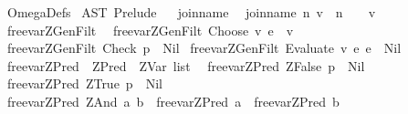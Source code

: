 %
\begin{isabellebody}%
%
%
\isadelimtheory
%
\endisadelimtheory
%
\isatagtheory
{}\isamarkupfalse%
\ OmegaDefs\isanewline
{}\ AST\ Prelude\isanewline
{}%
\endisatagtheory
{\isafoldtheory}%
%
\isadelimtheory
\isanewline
%
\endisadelimtheory
\ \isanewline
{}\isamarkupfalse%
\ join{\isacharunderscore}name\isanewline
{}\isanewline
\ \ {\isachardoublequoteopen}join{\isacharunderscore}name\ n\ v\ {\isacharequal}\ {\isacharparenleft}n\ {\isacharat}\ {\isacharparenleft}{\isacharprime}{\isacharprime}{\isacharunderscore}{\isacharprime}{\isacharprime}\ {\isacharat}\ v{\isacharparenright}{\isacharparenright}{\isachardoublequoteclose}\isanewline
\isanewline
\ \isanewline
{}\isamarkupfalse%
\ free{\isacharunderscore}var{\isacharunderscore}ZGenFilt\isanewline
{}\isanewline
\ \ {\isachardoublequoteopen}free{\isacharunderscore}var{\isacharunderscore}ZGenFilt\ {\isacharparenleft}Choose\ v\ e{\isacharparenright}\ {\isacharequal}\ {\isacharbrackleft}v{\isacharbrackright}{\isachardoublequoteclose}\isanewline
{\isacharbar}\ {\isachardoublequoteopen}free{\isacharunderscore}var{\isacharunderscore}ZGenFilt\ {\isacharparenleft}Check\ p{\isacharparenright}\ {\isacharequal}\ Nil{\isachardoublequoteclose}\isanewline
{\isacharbar}\ {\isachardoublequoteopen}free{\isacharunderscore}var{\isacharunderscore}ZGenFilt\ {\isacharparenleft}Evaluate\ v\ e{}\ e{}{\isacharparenright}\ {\isacharequal}\ Nil{\isachardoublequoteclose}\isanewline
\isanewline
\ \isanewline
{}\isamarkupfalse%
\ free{\isacharunderscore}var{\isacharunderscore}ZPred\ {\isacharcolon}{\isacharcolon}\ {\isachardoublequoteopen}ZPred\ {\isasymRightarrow}\ ZVar\ list{\isachardoublequoteclose}\isanewline
{}\isanewline
\ \ {\isachardoublequoteopen}free{\isacharunderscore}var{\isacharunderscore}ZPred\ {\isacharparenleft}ZFalse\ p{\isacharparenright}\ {\isacharequal}\ Nil{\isachardoublequoteclose}\isanewline
{\isacharbar}\ {\isachardoublequoteopen}free{\isacharunderscore}var{\isacharunderscore}ZPred\ {\isacharparenleft}ZTrue\ p{\isacharparenright}\ {\isacharequal}\ Nil{\isachardoublequoteclose}\isanewline
{\isacharbar}\ {\isachardoublequoteopen}free{\isacharunderscore}var{\isacharunderscore}ZPred\ {\isacharparenleft}ZAnd\ a\ b{\isacharparenright}\ {\isacharequal}\ {\isacharparenleft}free{\isacharunderscore}var{\isacharunderscore}ZPred\ a\ {\isacharat}\ free{\isacharunderscore}var{\isacharunderscore}ZPred\ b{\isacharparenright}{\isachardoublequoteclose}\isanewline

\end{isabellebody}
